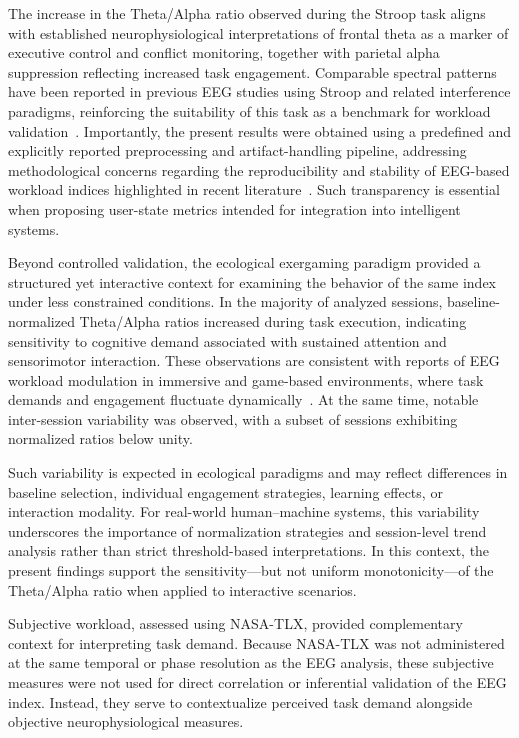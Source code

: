 \documentclass[10pt]{iopart}
\begin{document}
The increase in the Theta/Alpha ratio observed during the Stroop task aligns with established neurophysiological interpretations of frontal theta as a marker of executive control and conflict monitoring, together with parietal alpha suppression reflecting increased task engagement. Comparable spectral patterns have been reported in previous EEG studies using Stroop and related interference paradigms, reinforcing the suitability of this task as a benchmark for workload validation~\cite{c5,c9}. Importantly, the present results were obtained using a predefined and explicitly reported preprocessing and artifact-handling pipeline, addressing methodological concerns regarding the reproducibility and stability of EEG-based workload indices highlighted in recent literature~\cite{c4,c6}. Such transparency is essential when proposing user-state metrics intended for integration into intelligent systems.

Beyond controlled validation, the ecological exergaming paradigm provided a structured yet interactive context for examining the behavior of the same index under less constrained conditions. In the majority of analyzed sessions, baseline-normalized Theta/Alpha ratios increased during task execution, indicating sensitivity to cognitive demand associated with sustained attention and sensorimotor interaction. These observations are consistent with reports of EEG workload modulation in immersive and game-based environments, where task demands and engagement fluctuate dynamically~\cite{c2,c3}. At the same time, notable inter-session variability was observed, with a subset of sessions exhibiting normalized ratios below unity.

Such variability is expected in ecological paradigms and may reflect differences in baseline selection, individual engagement strategies, learning effects, or interaction modality. For real-world human--machine systems, this variability underscores the importance of normalization strategies and session-level trend analysis rather than strict threshold-based interpretations. In this context, the present findings support the sensitivity—but not uniform monotonicity—of the Theta/Alpha ratio when applied to interactive scenarios.

Subjective workload, assessed using NASA-TLX, provided complementary context for interpreting task demand. Because NASA-TLX was not administered at the same temporal or phase resolution as the EEG analysis, these subjective measures were not used for direct correlation or inferential validation of the EEG index. Instead, they serve to contextualize perceived task demand alongside objective neurophysiological measures.
\end{document}
